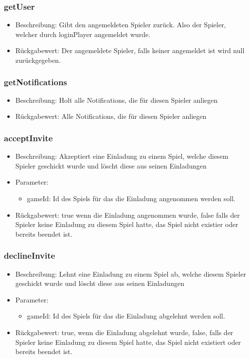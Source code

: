 \documentclass[a4paper]{scrreprt}
\begin{document}
	\subsubsection{getUser}
	\begin{itemize}
		\item Beschreibung: Gibt den angemeldeten Spieler zurück. Also der Spieler, welcher durch loginPlayer angemeldet wurde.
		\item Rückgabewert: Der angemeldete Spieler, falls keiner angemeldet ist wird null zurückgegeben.
	\end{itemize}
	
	\subsubsection{getNotifications}
	\begin{itemize}
		\item Beschreibung: Holt alle Notifications, die für diesen Spieler anliegen
		\item Rückgabewert:  Alle Notifications, die für diesen Spieler anliegen
	\end{itemize}
	\subsubsection{acceptInvite}
	\begin{itemize}
		\item Beschreibung: Akzeptiert eine Einladung zu einem Spiel, welche diesem Spieler geschickt wurde und löscht diese aus seinen Einladungen
		\item Parameter:
		\begin{itemize}
			\item gameId: Id des Spiels für das die Einladung angenommen werden soll.
		\end{itemize}
		\item Rückgabewert: true wenn die Einladung angenommen wurde, false falls der Spieler keine Einladung zu diesem Spiel hatte, das Spiel nicht existier oder bereits beendet ist.
	\end{itemize}
	\subsubsection{declineInvite}
	\begin{itemize}
		\item Beschreibung: Lehnt eine Einladung zu einem Spiel ab, welche diesem Spieler geschickt wurde und löscht diese aus seinen Einladungen
		\item Parameter:
		\begin{itemize}
			\item gameId: Id des Spiels für das die Einladung abgelehnt werden soll.
		\end{itemize}
		\item Rückgabewert: true, wenn die Einladung abgelehnt wurde, false, falls der Spieler keine Einladung zu diesem Spiel hatte, das Spiel nicht existiert oder bereits beendet ist.
	\end{itemize}
\end{document}
